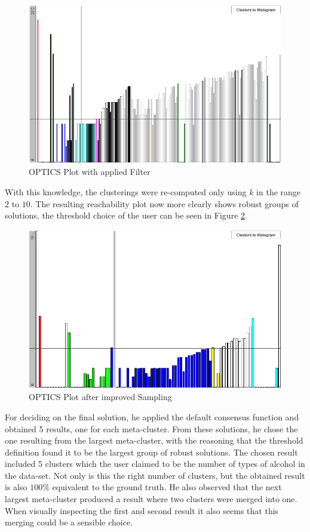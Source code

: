\documentclass[
	a4paper,
	english,
	twoside,
	openright,               
	11pt                            
	]{report}
\begin{document}
\begin{figure}[h]
	\centering
	\includegraphics[scale=.5]{user_qcm_optics}
	\caption{OPTICS Plot with applied Filter}
	\label{fig:user_qcm_optics}
\end{figure}

With this knowledge, the clusterings were re-computed only using $k$ in the range $2$ to $10$. The resulting reachability plot now more clearly shows robust groups of solutions, the threshold choice of the user can be seen in Figure \ref{fig:user_qcm_optics2}.

\begin{figure}[h]
	\centering
	\includegraphics[scale=.5]{user_qcm_optics2}
	\caption{OPTICS Plot after improved Sampling}
	\label{fig:user_qcm_optics2}
\end{figure}

For deciding on the final solution, he applied the default consensus function and obtained 5 results, one for each meta-cluster. From these solutions, he chose the one resulting from the largest meta-cluster, with the reasoning that the threshold definition found it to be the largest group of robust solutions. The chosen result included 5 clusters which the user claimed to be the number of types of alcohol in the data-set. Not only is this the right number of clusters, but the obtained result is also $100\% $ equivalent to the ground truth. He also observed that the next largest meta-cluster produced a result where two clusters were merged into one. When visually inspecting the first and second result it also seems that this merging could be a sensible choice.
\end{document}
